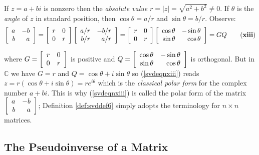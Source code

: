 If $z=a+bi$ is nonzero then the \emph{absolute value} $r=|z| =\sqrt{a^{2}+b^{2}}\neq 0$. If $\theta $ is the \emph{angle} of 
$z$ in standard position, then $\cos\theta =a/r$ and $\sin\theta =b/r$. Observe:
\begin{equation}\label{svdeqnxiii}
\leftB 
\begin{array}{rr}
a & -b \\ 
b & a
\end{array}
\rightB =\leftB 
\begin{array}{cc}
r & 0 \\ 
0 & r
\end{array}
\rightB \leftB 
\begin{array}{rr}
a/r & -b/r \\ 
b/r & a/r
\end{array}
\rightB =\leftB 
\begin{array}{cc}
r & 0 \\ 
0 & r
\end{array}
\rightB \leftB 
\begin{array}{rr}
\cos\theta  & -\sin\theta  \\ 
\sin\theta  & \cos\theta 
\end{array}
\rightB =  GQ \tag{\textbf{xiii}}
\end{equation}

\noindent where $G=
\left[ 
\begin{array}{cc}
r & 0 \\ 
0 & r
\end{array}
\right]$ is positive and $Q=
\left[ 
\begin{array}{rr}
\cos\theta  & -\sin\theta  \\ 
\sin\theta  & \cos\theta 
\end{array}
\right] $ is orthogonal. But in $\mathbb{C}$ we have $G=r$ and $Q=\cos\theta +i\sin\theta $ so (\ref{svdeqnxiii}) reads $z=r(\cos\theta +i\sin\theta )=re^{i\theta }$ which is the 
\emph{classical polar form} for the complex number $a+bi$. This is
why (\ref{svdeqnxiii}) is called the polar form of the matrix $
\left[ 
\begin{array}{rr}
a & -b \\ 
b & a
\end{array}
\right]$; Definition \ref{def:svddef6} simply adopts the terminology for $n\times n$
matrices.

\subsection{The Pseudoinverse of a Matrix}

